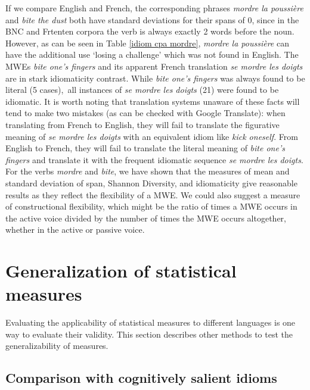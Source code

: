 \documentclass[output=paper]{langsci/langscibook}
\begin{document}
If we compare English and French, the corresponding phrases \textit{mordre la
poussière} and \textit{bite the dust} both have standard deviations for their
spans of 0, since in the BNC and Frtenten corpora the verb is always
exactly 2 words before the noun. However, as can be seen in Table \ref{idiom cpa mordre},
\textit{mordre la poussière} can have the additional use `losing a challenge'
which was not found in English. The MWEs \textit{bite one's fingers} and its
apparent French translation \textit{se mordre les doigts} are in stark
idiomaticity contrast. While \textit{bite one's fingers} was always found to
be literal (5 cases),~all instances of \textit{se mordre les doigts} (21) were
found to be idiomatic. It is worth noting that translation systems
unaware of these facts will tend to make two mistakes (as can be
checked with Google Translate): when translating from French to
English, they will fail to translate the figurative meaning of \textit{se mordre les doigts} with an equivalent idiom like \textit{kick oneself}. From
English to French, they will fail to translate the literal meaning of
\textit{bite one's fingers} and translate it with the frequent idiomatic
sequence \textit{se mordre les doigts}. For the verbs \textit{mordre} and \textit{bite}, we
have shown that the measures of mean and standard deviation of span,
Shannon Diversity, and idiomaticity give reasonable results as they
reflect the flexibility of a MWE. We could also suggest a measure of
constructional flexibility, which might be the ratio of times a MWE
occurs in the active voice divided by the number of times the MWE
occurs altogether, whether in the active or passive voice.


\section{Generalization of statistical measures}

Evaluating the applicability of statistical measures to different
languages is one way to evaluate their validity. This section describes
other methods to test the generalizability of measures.


\subsection{Comparison with cognitively salient idioms}
\end{document}
